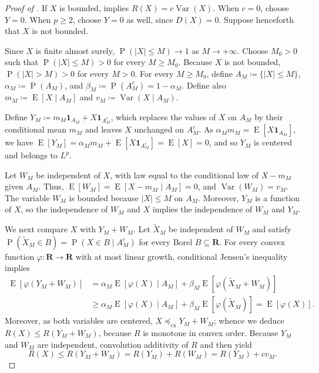 \documentclass[10pt,a4paper]{amsart}
\begin{document}
\begin{proof}[Proof of ]
If \(X\) is bounded,  implies \(R(X)=c\operatorname{Var}(X)\). When \(c=0\), choose \(Y=0\). When \(p\geq2\), choose \(Y=0\) as well, since \(D(X)=0\). Suppose henceforth that \(X\) is not bounded.


Since \(X\) is finite almost surely,
\(\operatorname{P}(|X|\leq M)\to1\) as \(M\to+\infty\). Choose \(M_0>0\) such that
\(\operatorname{P}(|X|\leq M)>0\) for every \(M\geq M_0\). Because \(X\) is not bounded, \(\operatorname{P}(|X|>M)>0\) for every \(M>0\). For every \(M\geq M_0\), define
\(A_M\coloneqq\{|X|\leq M\}\), \(\alpha_M\coloneqq\operatorname{P}(A_M)\), and \(\beta_M\coloneqq\operatorname{P}(A_M^c)=1-\alpha_M\). Define also \(m_M\coloneqq\operatorname{E}[X\mid A_M]\) and \(v_M\coloneqq\operatorname{Var}(X\mid A_M)\).

Define \(Y_M\coloneqq m_M\mathbf 1_{A_M}+X\mathbf 1_{A_M^c}\), which replaces the values of \(X\) on \(A_M\) by their conditional mean \(m_M\) and leaves \(X\) unchanged on \(A_M^c\). As \(\alpha_Mm_M=\operatorname{E}[X\mathbf 1_{A_M}]\), we have \(\operatorname{E}[Y_M]
=
\alpha_Mm_M+\operatorname{E}[X\mathbf 1_{A_M^c}]
=
\operatorname{E}[X]
=
0\), and so \(Y_M\) is centered and belongs to \(L^p\).

Let \(W_M\) be independent of \(X\), with law equal to the conditional law of \(X-m_M\) given \(A_M\). Thus, \(\operatorname{E}[W_M]
=
\operatorname{E}[X-m_M\mid A_M]
=
0\), and \(\operatorname{Var}(W_M)=v_M\). The variable \(W_M\) is bounded because \(|X|\leq M\) on \(A_M\). Moreover, \(Y_M\) is a function of \(X\), so the independence of \(W_M\) and \(X\) implies the independence of \(W_M\) and \(Y_M\).

We next compare \(X\) with \(Y_M+W_M\). Let \(\widetilde X_M\) be independent of \(W_M\) and satisfy \(\operatorname{P}(\widetilde X_M\in B) = \operatorname{P}(X\in B\mid A_M^c)\) for every Borel \(B\subseteq\mathbf R\). For every convex function \(\varphi\colon\mathbf R\to\mathbf R\) with at most linear growth, conditional Jensen's inequality implies
\[
\begin{aligned}
\operatorname{E}\left[\varphi(Y_M+W_M)\right]
&=\alpha_M\operatorname{E}\left[\varphi(X)\mid A_M\right]
+\beta_M\operatorname{E}\left[\varphi(\widetilde X_M+W_M)\right]\\
&\geq\alpha_M\operatorname{E}\left[\varphi(X)\mid A_M\right]
+\beta_M\operatorname{E}\left[\varphi(\widetilde X_M)\right] =\operatorname{E}\left[\varphi(X)\right].
\end{aligned}
\]
Moreover, as both variables are centered, \(X\preceq_{\mathrm{cx}}Y_M+W_M\); whence we deduce \(R(X)\leq R(Y_M+W_M)\), because \(R\) is monotone in convex order. Because \(Y_M\) and \(W_M\) are independent, convolution additivity of \(R\) and  then yield
\[
R(X)
\leq
R(Y_M+W_M)
=
R(Y_M)+R(W_M)
=
R(Y_M)+cv_M.
\tag{2}\label{eq:compression-risk-bound}
\]


\end{proof}
\end{document}
